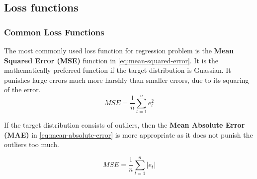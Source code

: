 \subsection{Loss functions}
\label{loss-functions}


\subsubsection{Common Loss Functions}
The most commonly used loss function for regression problem is the 
\textbf{Mean Squared Error (MSE)} function in \autoref{eq:mean-squared-error}.
It is the mathematically preferred function if the target distribution is Guassian.
It punishes large errors much more harshly than smaller errors, due to its squaring of the error.
\begin{equation}
  \label{eq:mean-squared-error}
  MSE = \frac{1}{n} \sum_{t=1}^n e_t^2
\end{equation}

If the target distribution consists of outliers, then the 
\textbf{Mean Absolute Error (MAE)} in \autoref{eq:mean-absolute-error} is more appropriate
as it does not punish the outliers too much.

\begin{equation}
  \label{eq:mean-absolute-error}
  MSE = \frac{1}{n} \sum_{t=1}^n |e_t|
\end{equation}
